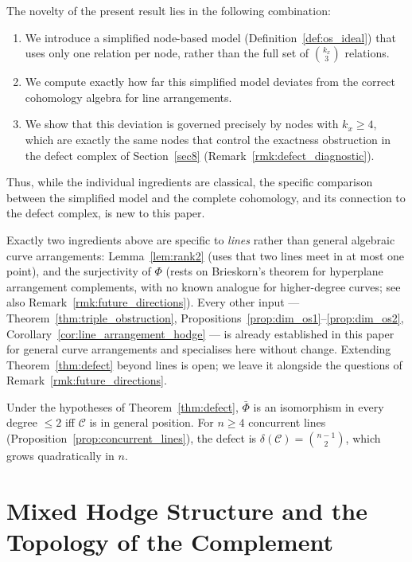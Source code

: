\documentclass[article,11pt]{amsart} \numberwithin{equation}{section}
\numberwithin{equation}{section}
\begin{document}
{\begin{rk}
	The novelty of the present result lies in the following combination:
	\begin{enumerate}
		\item We introduce a simplified node-based model (Definition~\ref{def:os_ideal}) that
		uses only one relation per node, rather than the full set of $\binom{k_x}{3}$ relations.
		\item We compute exactly how far this simplified model deviates from the correct
		cohomology algebra for line arrangements.
		\item We show that this deviation is governed precisely by nodes with $k_x\ge4$,
		which are exactly the same nodes that control the exactness obstruction in the
		defect complex of Section~\ref{sec8} (Remark~\ref{rmk:defect_diagnostic}).
	\end{enumerate}
	Thus, while the individual ingredients are classical, the specific comparison between the
	simplified model and the complete cohomology, and its connection to the defect complex, is
	new to this paper.
	
	Exactly two ingredients above are specific to \emph{lines} rather than general algebraic
	curve arrangements: Lemma~\ref{lem:rank2} (uses that two lines meet in at most one point),
	and the surjectivity of $\Phi$ (rests on Brieskorn's theorem for hyperplane arrangement
	complements, with no known analogue for higher-degree curves; see also
	Remark~\ref{rmk:future_directions}). Every other input — Theorem~\ref{thm:triple_obstruction},
	Propositions~\ref{prop:dim_os1}--\ref{prop:dim_os2}, Corollary~\ref{cor:line_arrangement_hodge}
	— is already established in this paper for general curve arrangements and specialises here
	without change. Extending Theorem~\ref{thm:defect} beyond lines is open; we leave it
	alongside the questions of Remark~\ref{rmk:future_directions}.
\end{rk}

\begin{cor}\label{cor:genpos}
	Under the hypotheses of Theorem~\ref{thm:defect}, $\bar\Phi$ is an isomorphism in every
	degree $\leq2$ iff $\mathcal{C}$ is in general position. For $n\geq4$ concurrent lines
	(Proposition~\ref{prop:concurrent_lines}), the defect is $\delta(\mathcal{C})=\binom{n-1}{2}$,
	which grows quadratically in $n$.
\end{cor}

\section{Mixed Hodge Structure and the Topology of the Complement}
\label{sec:hodge}

}
\end{document}
